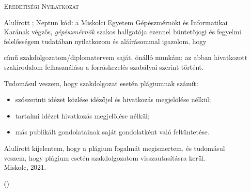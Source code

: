 
\begin{center}
	\textsc{\Large{Eredetiségi Nyilatkozat}}
\end{center}
{
	Alulírott \textbf{\nev}; Neptun kód: \textit{\neptun} a Miskolci Egyetem Gépészmérnöki és Informatikai Karának végzős, \textit{gépészmérnök} szakos hallgatója ezennel büntetőjogi és fegyelmi felelősségem tudatában nyilatkozom és aláírásommal igazolom, hogy
	\begin{center}
		\cim
	\end{center}
	című szakdolgozatom/diplomatervem saját, önálló munkám; az abban hivatkozott szakirodalom felhasználása a forráskezelés szabályai szerint történt.
	
	Tudomásul veszem, hogy szakdolgozat esetén plágiumnak számít:
	\begin{itemize}
		\item szószerinti idézet közlése idézőjel és hivatkozás megjelölése nélkül;
		\item	tartalmi idézet hivatkozás megjelölése nélkül;
		\item	más publikált gondolatainak saját gondolatként való feltüntetése.	 
	\end{itemize}
	Alulírott kijelentem, hogy a plágium fogalmát megismertem, és tudomásul veszem, hogy
	plágium esetén szakdolgozatom visszautasításra kerül.\\
	Miskolc, 2021.
	
	
	{\raggedleft\vspace{1cm}(\textit{\nev})
		
	}
}

